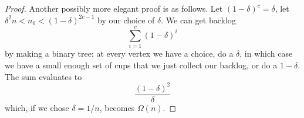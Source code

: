 \documentclass[twocolumn]{article}[11pt]
\begin{document}
\begin{proof}
{    Another possibly more elegant proof is as follows.
    Let $(1-\delta)^c = \delta$, let $\delta^2 n < n_0 < (1-\delta)^{2c-1}$ by our choice of $\delta$.
    We can get backlog 
    $$\sum_{i=1}^c (1-\delta)^i $$
    by making a binary tree: at every vertex we have a choice, do a $\delta$,
    in which case we have a small enough set of cups that we just collect our
    backlog, or do a $1-\delta$.
    The sum evaluates to 
    $$\frac{(1-\delta)^2}{\delta}$$
    which, if we chose $\delta = 1/n$, becomes $\Omega(n)$.


  }



\end{proof}
\end{document}
